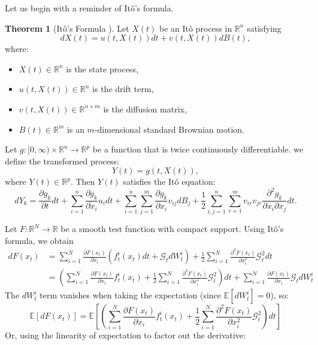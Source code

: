 \documentclass[a4paper,10pt]{article}
\theoremstyle{definition} %
\theoremstyle{definition} %
\theoremstyle{definition} %
\newtheorem{theorem}[definition]{Theorem}
\theoremstyle{definition} %
\newcommand{\0}{\boldsymbol{0}}
\begin{document}
Let us begin with a reminder of Itô's formula.
\begin{theorem}[Itô's Formula \cite{Oksendal2003}]
Let \( X(t) \) be an Itô process in \( \mathbb{R}^n \) satisfying  
\[
dX(t) = u(t, X(t)) dt + v(t, X(t)) dB(t),
\]
where:
\begin{itemize}
    \item[] \( X(t) \in \mathbb{R}^n \) is the state process,
    \item[] \( u(t, X(t)) \in \mathbb{R}^n \) is the drift term,
    \item[] \( v(t, X(t)) \in \mathbb{R}^{n \times m} \) is the diffusion matrix,
    \item[] \( B(t) \in \mathbb{R}^m \) is an \( m \)-dimensional standard Brownian motion.
\end{itemize}
Let \( g: [0, \infty) \times \mathbb{R}^n \to \mathbb{R}^p \) be a function that is twice continuously differentiable.  
we define the transformed process:
\[
Y(t) = g(t, X(t)),
\]
where \( Y(t) \in \mathbb{R}^p \).  
Then \( Y(t) \) satisfies the Itô equation:
\[
dY_k = \frac{\partial g_k}{\partial t} dt 
+ \sum\limits_{i=1}^{n} \frac{\partial g_k}{\partial x_i} u_i dt 
+ \sum\limits_{i=1}^{n} \sum\limits_{j=1}^{m} \frac{\partial g_k}{\partial x_i} v_{ij} dB_j
+ \frac{1}{2} \sum\limits_{i,j=1}^{n} \sum\limits_{r=1}^{m} v_{ir} v_{jr} \frac{\partial^2 g_k}{\partial x_i \partial x_j} dt.
\]
\end{theorem}
Let \( F: \mathbb{R}^N \rightarrow \mathbb{R} \) be a smooth test function with compact support. Using Itô’s formula, we obtain
\begin{align*}
    dF(x_t) &= \sum\limits_{i=1}^N \frac{\partial F(x_t)}{\partial x_i} (f^i_t(x_t)dt + \mathcal{G}_t dW^i_t) + \frac{1}{2} \sum\limits_{i=1}^N  \frac{\partial^2 F(x_t)}{\partial x_i^2} \mathcal{G}_t^2 dt \\
    &= \left(\sum\limits_{i=1}^N \frac{\partial F(x_t)}{\partial x_i} f^i_t(x_t) + \frac{1}{2} \sum\limits_{i=1}^N  \frac{\partial^2 F(x_t)}{\partial x_i^2} \mathcal{G}_t^2\right)dt + \sum\limits_{i=1}^N \frac{\partial F(x_t)}{\partial x_i}  \mathcal{G}_t dW^i_t
\end{align*}
The \( dW_t^i \) term vanishes when taking the expectation (since \( \mathbb{E}[dW_t^i] = 0 \)), so:
\[
\mathbb{E}[dF(x_t)] = \mathbb{E}\left[\left(\sum\limits_{i=1}^N \frac{\partial F(x_t)}{\partial x_i} f^i_t(x_t) + \frac{1}{2} \sum\limits_{i=1}^N \frac{\partial^2 F(x_t)}{\partial x_i^2} \mathcal{G}_t^2\right)dt\right]
\]
Or, using the linearity of expectation to factor out the derivative:
\end{document}
